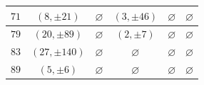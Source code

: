 \documentclass[12pt]{amsart}
\newcommand{\?}{\color{red}?}
\numberwithin{equation}{section}
\begin{document}
\begin{center}
\begin{table}
\begin{tabular}{|c|c|c|c|c|c|}
$71$ & $(8,\pm 21)$  & $\varnothing$ & $(3,\pm 46)$ & $\varnothing$ & $\varnothing$\\ \hline
$79$ & $(20, \pm 89)$  & $\varnothing$ & $(2,\pm 7)$ & $\varnothing$ & $\varnothing$\\ \hline
$83$ & $(27, \pm 140)$  & $\varnothing$ & $\varnothing$ & $\varnothing$ & $\varnothing$\\ \hline
$89$ & $(5,\pm 6) $  & $\varnothing$ & $\varnothing$ & $\varnothing$ & $\varnothing$\\ \hline
\end{tabular}
\medskip
{}
\label{Cminustable}
\end{table}
\end{center}
\endgroup


\bigskip
\end{document}
